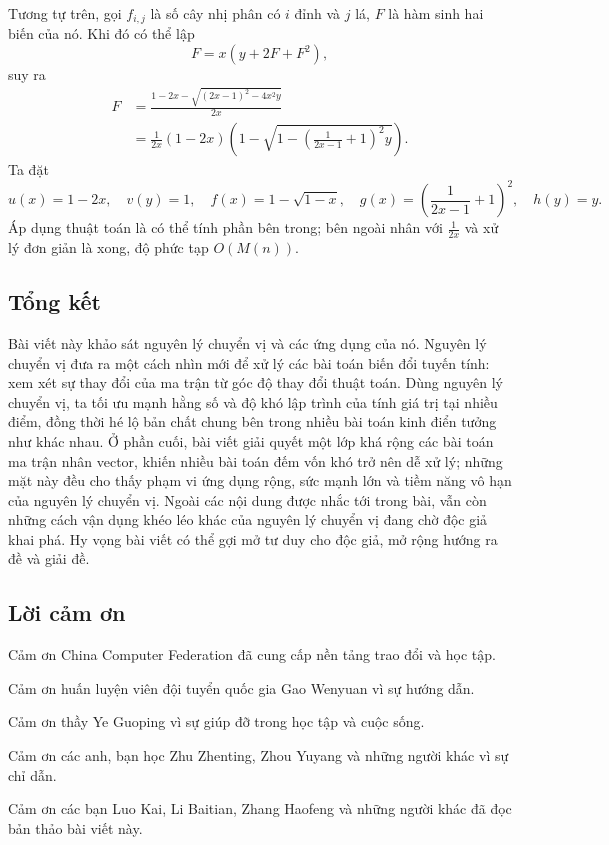 \documentclass[11pt]{article}
\begin{document}
 Tương tự trên, gọi \(f_{i,j}\) là số cây nhị phân có \(i\) đỉnh
và \(j\) lá, \(F\) là hàm sinh hai biến của nó. Khi đó có thể lập
\[
  F=x(y+2F+F^2),
\]
suy ra
\[
\begin{aligned}
F
&=\frac{1-2x-\sqrt{(2x-1)^2-4x^2y}}{2x}\\
&=\frac{1}{2x}(1-2x)
  \left(1-\sqrt{1-\left(\frac{1}{2x-1}+1\right)^2y}\right).
\end{aligned}
\]
Ta đặt
\[
  u(x)=1-2x,\quad v(y)=1,\quad f(x)=1-\sqrt{1-x},\quad
  g(x)=\left(\frac{1}{2x-1}+1\right)^2,\quad h(y)=y.
\]
Áp dụng thuật toán là có thể tính phần bên trong; bên ngoài nhân với
\(\frac{1}{2x}\) và xử lý đơn giản là xong, độ phức tạp \(O(M(n))\).

\subsection{Tổng kết}

Bài viết này khảo sát nguyên lý chuyển vị và các ứng dụng của nó. Nguyên lý
chuyển vị đưa ra một cách nhìn mới để xử lý các bài toán biến đổi tuyến tính:
xem xét sự thay đổi của ma trận từ góc độ thay đổi thuật toán. Dùng nguyên lý
chuyển vị, ta tối ưu mạnh hằng số và độ khó lập trình của tính giá trị tại
nhiều điểm, đồng thời hé lộ bản chất chung bên trong nhiều bài toán kinh điển
tưởng như khác nhau. Ở phần cuối, bài viết giải quyết một lớp khá rộng các bài
toán ma trận nhân vector, khiến nhiều bài toán đếm vốn khó trở nên dễ xử lý;
những mặt này đều cho thấy phạm vi ứng dụng rộng, sức mạnh lớn và tiềm năng vô
hạn của nguyên lý chuyển vị. Ngoài các nội dung được nhắc tới trong bài, vẫn
còn những cách vận dụng khéo léo khác của nguyên lý chuyển vị đang chờ độc giả
khai phá. Hy vọng bài viết có thể gợi mở tư duy cho độc giả, mở rộng hướng ra
đề và giải đề.

\subsection{Lời cảm ơn}

Cảm ơn China Computer Federation đã cung cấp nền tảng trao đổi và học tập.

Cảm ơn huấn luyện viên đội tuyển quốc gia Gao Wenyuan vì sự hướng dẫn.

Cảm ơn thầy Ye Guoping vì sự giúp đỡ trong học tập và cuộc sống.

Cảm ơn các anh, bạn học Zhu Zhenting, Zhou Yuyang và những người khác vì sự chỉ
dẫn.

Cảm ơn các bạn Luo Kai, Li Baitian, Zhang Haofeng và những người khác đã đọc
bản thảo bài viết này.
\end{document}
